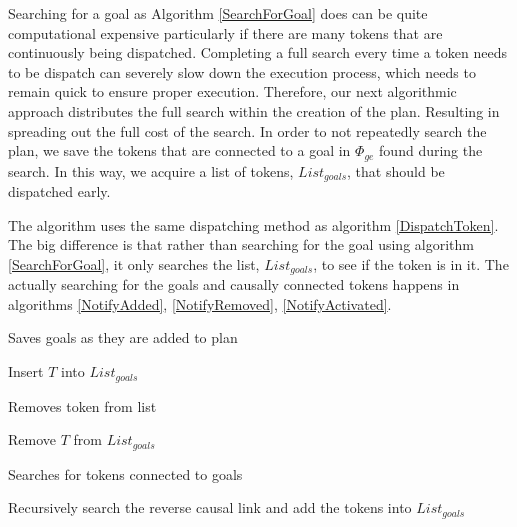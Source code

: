Searching for a goal as Algorithm \ref{SearchForGoal} does can be
quite computational expensive particularly if there are many tokens
that are continuously being dispatched. Completing a full search every
time a token needs to be dispatch can severely slow down the execution
process, which needs to remain quick to ensure proper
execution. Therefore, our next algorithmic approach distributes the
full search within the creation of the plan.  Resulting in spreading out the full cost of the
search. In order to not repeatedly search the plan, we save the tokens
that are connected to a goal in $\Phi_{ge}$ found during the
search. In this way, we acquire a list of tokens, $List_{goals}$, that should be
dispatched early.

The algorithm uses the same dispatching method as algorithm \ref{DispatchToken}.
The big difference is that rather than searching for the goal using algorithm \ref{SearchForGoal}, 
it only searches the list, $List_{goals}$, to see if the token is in it. The actually searching for the goals and causally 
connected tokens happens in algorithms \ref{NotifyAdded}, \ref{NotifyRemoved}, \ref{NotifyActivated}.

\begin{algorithm}
\caption{Saves goals as they are added to plan}
\label{NotifyAdded}
\begin{algorithmic}
	\State Insert $T$ into $List_{goals}$
\EndIf 
\EndFunction
\end{algorithmic}
\end{algorithm}

\begin{algorithm}
\caption{Removes token from list}
\label{NotifyRemoved}
\begin{algorithmic}
	\State Remove $T$ from $List_{goals}$
\EndFunction
\end{algorithmic}
\end{algorithm}

\begin{algorithm}
\caption{Searches for tokens connected to goals}
\label{NotifyActivated}
\begin{algorithmic}
	\State Recursively search the reverse causal link and add the tokens into $List_{goals}$
\EndIf
\EndFunction
\end{algorithmic}
\end{algorithm}

